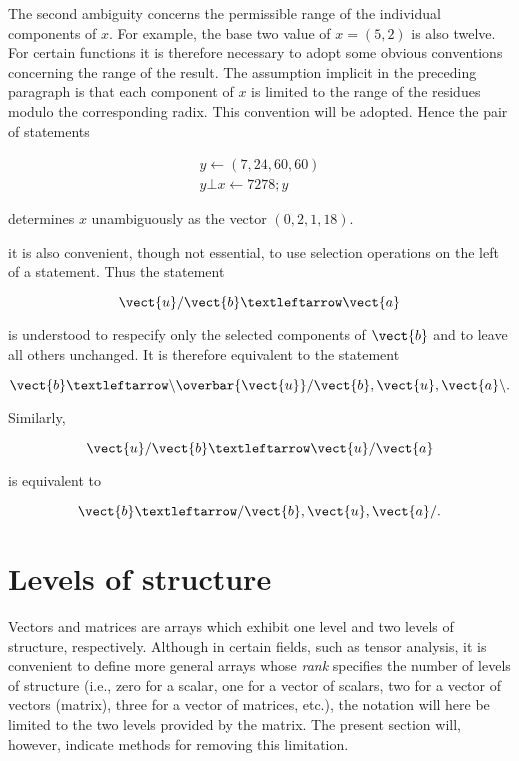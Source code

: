 \par The second ambiguity concerns the permissible range of the individual components of $x$. For example, the base two value of $x = (5, 2)$ is also twelve. For certain functions it is therefore necessary to adopt some obvious conventions concerning the range of the result. The assumption implicit in the preceding paragraph is that each component of $x$ is limited to the range of the residues modulo the corresponding radix. This convention will be adopted. Hence the pair of statements

\begin{align*}
  y ← (7, 24, 60, 60) \\
  y ⊥ x ← 7278; y
\end{align*}

\noindent determines $x$ unambiguously as the vector $(0, 2, 1, 18)$.

\par it is also convenient, though not essential, to use selection operations on the left of a statement. Thus the statement

$$
  \vect{u}/\vect{b} ← \vect{a}
$$

\noindent is understood to respecify only the selected components of $\vect{b}$ and to leave all others unchanged. It is therefore equivalent to the statement

$$
  \vect{b} ← \backslash\overbar{\vect{u}}/\vect{b}, \vect{u}, \vect{a}\backslash.
$$

\noindent Similarly,

$$
  \vect{u}/\vect{b} ← \vect{u}/\vect{a}
$$

\noindent is equivalent to

$$
  \vect{b} ← /\vect{b}, \vect{u}, \vect{a}/.
$$

\section{Levels of structure}

\par Vectors and matrices are arrays which exhibit one level and two levels of structure, respectively. Although in certain fields, such as tensor analysis, it is convenient to define more general arrays whose \textit{rank} specifies the number of levels of structure (i.e., zero for a scalar, one for a vector of scalars, two for a vector of vectors (matrix), three for a vector of matrices, etc.), the notation will here be limited to the two levels provided by the matrix.%
The present section will, however, indicate methods for removing this limitation.

